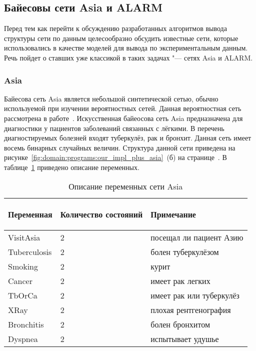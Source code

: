 \subsection{Байесовы сети Asia и ALARM}
\label{sub:arch_and_mod:asia_and_alarm}

Перед тем как перейти к обсуждению разработанных алгоритмов вывода структуры сети по данным целесообразно обсудить известные сети, которые использовались в качестве моделей для вывода по экспериментальным данным.
Речь пойдет о ставших уже классикой в таких задачах "--- сетях Asia и ALARM.

\subsubsection{Asia }
\label{sub:arch_and_mod:asia_and_alarm:asia}

Байесова сеть Asia является небольшой синтетической сетью, обычно используемой при изучении вероятностных сетей.
Данная вероятностная сеть рассмотрена в работе~\cite{Lauritzen_Spiegelhalter88}.
Искусственная байеосова сеть Asia предназначена для диагностики у пациентов заболеваний связанных с лёгкими.
В перечень диагностируемых болезней входят туберкулёз, рак и бронхит.
Данная сеть имеет восемь бинарных случайных величин.
Структура данной сети приведена на рисунке~\ref{fig:domain:programs:our_impl_plus_asia}~(б) на странице~\pageref{fig:domain:programs:our_impl_plus_asia}.
В таблице~\ref{table:arch_and_mod:asia_and_alarm:asia:vars} приведено описание переменных.

\begin{table}[ht]
\caption{Описание переменных сети Asia}
\label{table:arch_and_mod:asia_and_alarm:asia:vars}
\centering
  \begin{tabular}{| >{\raggedright}m{} 
                  | >{\centering}m{} 
                  | >{\raggedright\arraybackslash}m{}|}
  \hline Переменная & Количество состояний & \begin{center} Примечание \end{center} \\
  \hline VisitAsia & \num{2} & посещал ли пациент Азию \\
  \hline Tuberculosis & \num{2} & болен туберкулёзом \\
  \hline Smoking & \num{2} & курит \\
  \hline Cancer & \num{2} & имеет рак легких \\
  \hline TbOrCa & \num{2} & имеет рак или туберкулёз \\
  \hline XRay & \num{2} & плохая рентгенография \\
  \hline Bronchitis & \num{2} & болен бронхитом \\
  \hline Dyspnea & \num{2} & испытывает удушье \\
  \hline
  \end{tabular}
\end{table}



